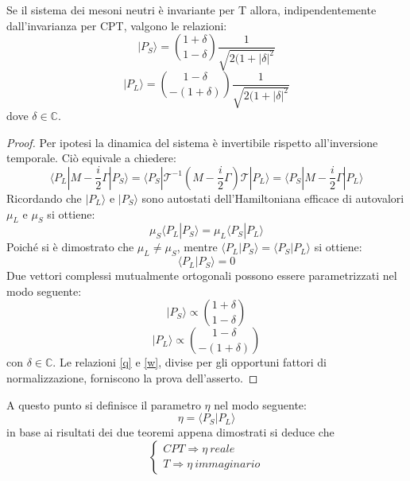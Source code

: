 %
%
\begin{teorema}
 Se il sistema dei mesoni neutri è invariante per T allora, indipendentemente dall'invarianza per CPT, valgono le relazioni:
\begin{equation}
 |P_S\rangle = \binom{1+\delta}{1-\delta} \frac{1}{\sqrt{2(1+{|\delta|}^2}}
\end{equation}
\begin{equation}
 |P_L\rangle = \binom{1-\delta}{-(1+\delta)} \frac{1}{\sqrt{2(1+{|\delta|}^2}}
\end{equation}
dove $\delta\in \mathbb{C}$.
\end{teorema}
%
\begin{proof}
Per ipotesi la dinamica del sistema è invertibile rispetto all'inversione temporale. Ciò equivale a chiedere:
\begin{equation}
 \langle P_L|M-\frac{i}{2}\Gamma|P_S\rangle = \langle P_S|\mathscr{T}^{-1}(M-\frac{i}{2}\Gamma)\mathscr{T}|P_L\rangle = \langle P_S|M-\frac{i}{2}\Gamma|P_L\rangle
\end{equation}
Ricordando che $|P_L\rangle$ e $|P_S\rangle$ sono autostati dell'Hamiltoniana efficace di autovalori $\mu_L$ e $\mu_S$ si ottiene:
\begin{equation}
 \mu_S \langle P_L|P_S\rangle = \mu_L \langle P_S|P_L\rangle
\end{equation}
Poiché si è dimostrato che $\mu_L \neq \mu_S$, mentre $\langle P_L|P_S\rangle = \langle P_S|P_L\rangle$ si ottiene:
\begin{equation}
 \langle P_L|P_S\rangle = 0
\end{equation}
Due vettori complessi mutualmente ortogonali possono essere parametrizzati nel modo seguente:
\begin{equation}\label{q}
 |P_S\rangle \varpropto \binom{1 + \delta}{1 - \delta}
\end{equation}
\begin{equation}\label{w}
 |P_L\rangle \varpropto \binom{1 - \delta}{-(1 + \delta)}
\end{equation}
con $\delta \in \mathbb{C}$. Le relazioni \eqref{q} e \eqref{w}, divise per gli opportuni fattori di normalizzazione, forniscono la prova dell'asserto. 
\end{proof}
%
%
A questo punto si definisce il parametro $\eta$ nel modo seguente:
\begin{equation}
 \eta = \langle P_S|P_L\rangle
\end{equation}
in base ai risultati dei due teoremi appena dimostrati si deduce che 
\begin{displaymath}
\left\{
\begin{array}{l}
CPT \Longrightarrow \eta  \ reale\\
T \Longrightarrow \eta \    immaginario
\end{array}
\right.
\end{displaymath}
